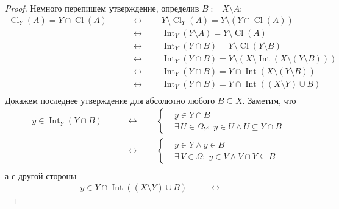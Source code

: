\documentclass[12pt,a4paper]{article}
\DeclareMathOperator{\Cl}{Cl}
\DeclareMathOperator{\Int}{Int}
\begin{document}
\begin{problem}{20}
        \begin{proof}
            Немного перепишем утверждение, определив $B := X \setminus A$:
            \begin{align*}
                \Cl_Y(A) = Y \cap \Cl(A)\qquad
                &\longleftrightarrow\qquad Y \setminus \Cl_Y(A) = Y \setminus (Y \cap \Cl(A))\\
                &\longleftrightarrow\qquad \Int_Y(Y \setminus A) = Y \setminus \Cl(A)\\
                &\longleftrightarrow\qquad \Int_Y(Y \cap B) = Y \setminus \Cl(Y \setminus B)\\
                &\longleftrightarrow\qquad \Int_Y(Y \cap B) = Y \setminus (X \setminus \Int(X \setminus (Y \setminus B)))\\
                &\longleftrightarrow\qquad \Int_Y(Y \cap B) = Y \cap \Int(X \setminus (Y \setminus B))\\
                &\longleftrightarrow\qquad \Int_Y(Y \cap B) = Y \cap \Int((X \setminus Y) \cup B)\\
            \end{align*}
            Докажем последнее утверждение для абсолютно любого $B \subseteq X$. Заметим, что
            \begin{align*}
                y \in \Int_Y(Y \cap B)\qquad
                &\longleftrightarrow\qquad
                    \left\{
                        \begin{aligned}
                            &y \in Y \cap B\\
                            &\exists\, U \in \Omega_Y:\; y \in U \wedge U \subseteq Y \cap B
                        \end{aligned}
                    \right.\\
                &\longleftrightarrow\qquad
                    \left\{
                        \begin{aligned}
                            &y \in Y \wedge y \in B\\
                            &\exists\, V \in \Omega:\; y \in V \wedge V \cap Y \subseteq B
                        \end{aligned}
                    \right.\\
            \end{align*}
            а с другой стороны
            \begin{align*}
                y \in Y \cap \Int((X \setminus Y) \cup B)\qquad
                &\longleftrightarrow\qquad

\end{align*}
\end{proof}
\end{problem}
\end{document}
